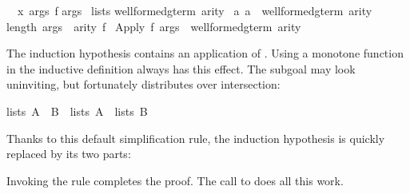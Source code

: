 \begin{isabellebody}
\begin{isamarkuptxt}
\begin{isabelle}
\ {}{\isachardot}\ {\isasymAnd}x\ args\ f{\isachardot}\isanewline
{}args\isanewline
{}\ lists\isanewline
{}well{\isacharunderscore}formed{\isacharunderscore}gterm{\isacharprime}\ arity\ {\isasyminter}\isanewline
{}a{\isachardot}\ a\ {\isasymin}\ well{\isacharunderscore}formed{\isacharunderscore}gterm\ arity{\isacharbraceright}{\isacharparenright}{\isacharsemicolon}\isanewline
{}length\ args\ {\isacharequal}\ arity\ f{\isasymrbrakk}\isanewline
{}\ Apply\ f\ args\ {\isasymin}\ well{\isacharunderscore}formed{\isacharunderscore}gterm\ arity%
\end{isabelle}
The induction hypothesis contains an application of .  Using a
monotone function in the inductive definition always has this effect.  The
subgoal may look uninviting, but fortunately 
 distributes over intersection:
\begin{isabelle}%
lists\ {\isacharparenleft}A\ {\isasyminter}\ B{\isacharparenright}\ {\isacharequal}\ lists\ A\ {\isasyminter}\ lists\ B%
\end{isabelle}
Thanks to this default simplification rule, the induction hypothesis 
is quickly replaced by its two parts:
\begin{trivlist}
\item {}
\item {}
\end{trivlist}
Invoking the rule  completes the proof.  The
call to  does all this work.


\end{isamarkuptxt}
\end{isabellebody}
